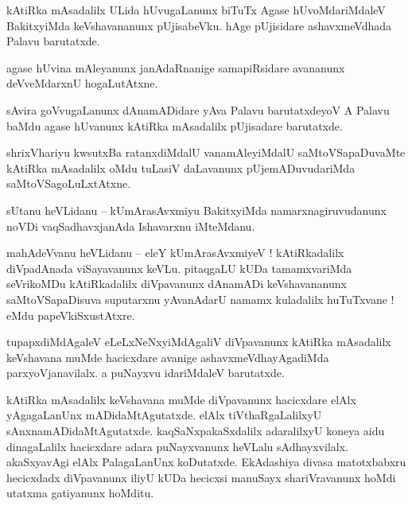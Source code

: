 \documentclass{article}
\begin{document}
\begin{mn}%
kAtiRka mAsadalilx ULida hUvugaLanunx biTuTx Agase hUvoMdariMdaleV BakitxyiMda keVshavananunx 
pUjisabeVku. hAge pUjisidare ashavxmeVdhada Palavu barutatxde.
\end{mn}

\begin{mn}%
agase hUvina mAleyanunx janAdaRnanige samapiRsidare avananunx deVveMdarxnU hogaLutAtxne.
\end{mn}

\begin{mn}%
sAvira goVvugaLanunx dAnamADidare yAva Palavu barutatxdeyoV A Palavu baMdu agase hUvanunx kAtiRka 
mAsadalilx pUjisadare barutatxde.
\end{mn}

\begin{mn}%
shrixVhariyu kwsutxBa ratanxdiMdalU vanamAleyiMdalU saMtoVSapaDuvaMte kAtiRka mAsadalilx oMdu 
tuLasiV daLavanunx pUjemADuvudariMda saMtoVSagoLuLxtAtxne.
\end{mn}

\begin{mn}%
sUtanu heVLidanu -- kUmArasAvxmiyu BakitxyiMda namarxnagiruvudanunx noVDi vaqSadhavxjanAda 
Ishavarxnu iMteMdanu.
\end{mn}

\begin{mn}%
mahAdeVvanu heVLidanu -- eleY kUmArasAvxmiyeV ! kAtiRkadalilx diVpadAnada viSayavanunx keVLu. 
pitaqgaLU kUDa tamamxvariMda seVrikoMDu kAtiRkadalilx diVpavanunx dAnamADi keVshavananunx 
saMtoVSapaDisuva suputarxnu yAvanAdarU namamx kuladalilx huTuTxvane ! eMdu papeVkiSxustAtxre.
\end{mn}

\begin{mn}%
tupapxdiMdAgaleV eLeLxNeNxyiMdAgaliV diVpavanunx kAtiRka mAsadalilx keVshavana muMde hacicxdare 
avanige ashavxmeVdhayAgadiMda parxyoVjanavilalx. a puNayxvu idariMdaleV barutatxde.
\end{mn}

\begin{mn}%
kAtiRka mAsadalilx keVshavana muMde diVpavanunx hacicxdare elAlx yAgagaLanUnx mADidaMtAgutatxde. 
elAlx tiVthaRgaLalilxyU sAnxnamADidaMtAgutatxde. kaqSaNxpakaSxdalilx adaralilxyU koneya aidu 
dinagaLalilx hacicxdare adara puNayxvanunx heVLalu sAdhayxvilalx. akaSxyavAgi elAlx PalagaLanUnx 
koDutatxde. EkAdashiya divasa matotxbabxru hecicxdadx diVpavanunx iliyU kUDa hecicxsi manuSayx 
shariVravanunx hoMdi utatxma gatiyanunx hoMditu.
\end{mn}
\end{document}

